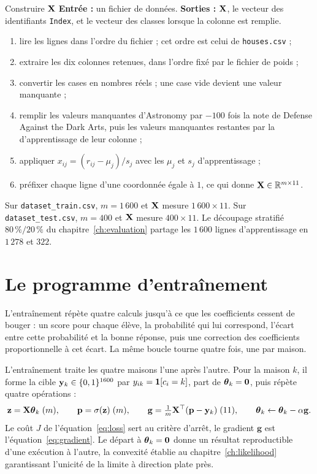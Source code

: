 \begin{procedure}{Construire $\mathbf{X}$}
\textbf{Entrée :} un fichier de données. \textbf{Sorties :} $\mathbf{X}$, le vecteur des
identifiants \texttt{Index}, et le vecteur des classes lorsque la colonne est
remplie.
\begin{enumerate}
  \item lire les lignes dans l'ordre du fichier ; cet ordre est celui de
        \texttt{houses.csv} ;
  \item extraire les dix colonnes retenues, dans l'ordre fixé par le fichier de
        poids ;
  \item convertir les cases en nombres réels ; une case vide devient une valeur
        manquante ;
  \item remplir les valeurs manquantes d'Astronomy par $-100$ fois la note de
        Defense Against the Dark Arts, puis les valeurs manquantes restantes par
        la  d'apprentissage de leur colonne ;
  \item appliquer $x_{ij}=(r_{ij}-\mu_j)/s_j$ avec les $\mu_j$ et $s_j$
        d'apprentissage ;
  \item préfixer chaque ligne d'une coordonnée égale à $1$, ce qui donne
        $\mathbf{X}\in\mathbb{R}^{m\times11}$.
\end{enumerate}
\end{procedure}

Sur \texttt{dataset\_train.csv}, $m=1\,600$ et $\mathbf{X}$ mesure $1\,600\times11$. Sur
\texttt{dataset\_test.csv}, $m=400$ et $\mathbf{X}$ mesure $400\times11$. Le découpage
stratifié $80\,\%/20\,\%$ du chapitre~\ref{ch:evaluation} partage les $1\,600$
lignes d'apprentissage en $1\,278$ et $322$.

\section{Le programme d'entraînement}

\begin{lecture}
L'entraînement répète quatre calculs jusqu'à ce que les coefficients cessent de
bouger : un score pour chaque élève, la probabilité qui lui correspond, l'écart
entre cette probabilité et la bonne réponse, puis une correction des coefficients
proportionnelle à cet écart. La même boucle tourne quatre fois, une par maison.
\end{lecture}

L'entraînement traite les quatre maisons l'une après l'autre. Pour la maison $k$,
il forme la cible $\mathbf{y}_k\in\{0,1\}^{1600}$ par $y_{ik}=\mathbf{1}[c_i=k]$, part de
$\boldsymbol{\theta}_k=\mathbf 0$, puis répète quatre opérations :
\[
  \mathbf z=\mathbf{X}\boldsymbol{\theta}_k\;(m),\qquad
  \mathbf p=\sigma(\mathbf z)\;(m),\qquad
  \mathbf g=\tfrac1m\mathbf{X}^\top(\mathbf p-\mathbf{y}_k)\;(11),\qquad
  \boldsymbol{\theta}_k\leftarrow\boldsymbol{\theta}_k-\alpha\mathbf g.
\]
Le coût $J$ de l'équation~\eqref{eq:loss} sert au critère d'arrêt, le gradient
$\mathbf g$ est l'équation~\eqref{eq:gradient}. Le départ à $\boldsymbol{\theta}_k=\mathbf 0$
donne un résultat reproductible d'une exécution à l'autre, la convexité établie
au chapitre~\ref{ch:likelihood} garantissant l'unicité de la limite à direction
plate près.

